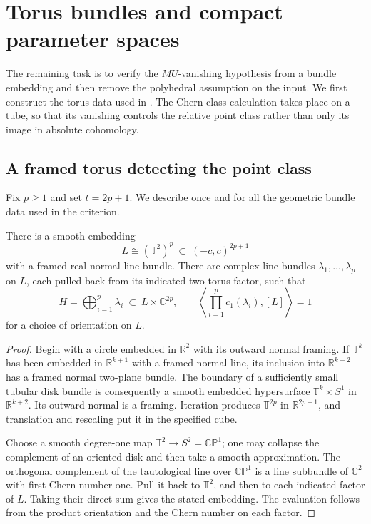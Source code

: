 \section{Torus bundles and compact parameter spaces}
\label{sec:torus-criterion}

The remaining task is to verify the $MU$-vanishing hypothesis from a
bundle embedding and then remove the polyhedral assumption on the
input.  We first construct the torus data used in
.  The Chern-class calculation takes place on a
tube, so that its vanishing controls the relative point class rather
than only its image in absolute cohomology.

\subsection{A framed torus detecting the point class}

Fix $p\ge1$ and set $t=2p+1$.  We describe once and for all the
geometric bundle data used in the criterion.

\begin{lemma}
\label{lem:framed-torus}
There is a smooth embedding
\[
 L\cong(\mathbb T^2)^p\ \subset\ (-c,c)^{2p+1}
\]
with a framed real normal line bundle.  There are complex line
bundles $\lambda_1,\ldots,\lambda_p$ on $L$, each pulled back from
its indicated two-torus factor, such that
\[
 H=\bigoplus_{i=1}^p\lambda_i\ \subset\ L\times\mathbb C^{2p},
 \qquad
 \left\langle\prod_{i=1}^p c_1(\lambda_i),[L]\right\rangle=1
\]
for a choice of orientation on $L$.
\end{lemma}

\begin{proof}
Begin with a circle embedded in $\mathbb R^2$ with its outward
normal framing.  If $\mathbb T^k$ has been embedded in
$\mathbb R^{k+1}$ with a framed normal line, its inclusion into
$\mathbb R^{k+2}$ has a framed normal two-plane bundle.  The boundary
of a sufficiently small tubular disk bundle is consequently a
smooth embedded hypersurface
$\mathbb T^k\times S^1$ in $\mathbb R^{k+2}$.  Its outward normal
is a framing.  Iteration produces $\mathbb T^{2p}$ in
$\mathbb R^{2p+1}$, and translation and rescaling put it in the
specified cube.

Choose a smooth degree-one map $\mathbb T^2\to S^2=\mathbb{CP}^1$;
one may collapse the complement of an oriented disk and then take
a smooth approximation.  The orthogonal complement of the
tautological line over $\mathbb{CP}^1$ is a line subbundle of
$\mathbb C^2$ with first Chern number one.  Pull it back to
$\mathbb T^2$, and then to each indicated factor of $L$.  Taking
their direct sum gives the stated embedding.  The evaluation follows
from the product orientation and the Chern number on each factor.
\end{proof}

